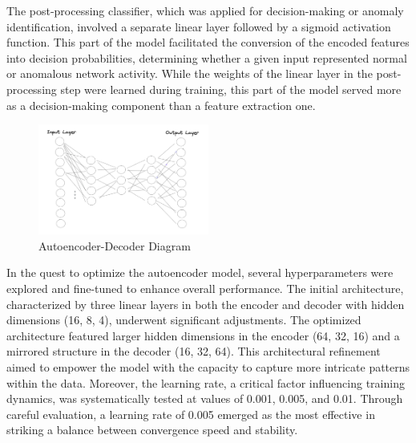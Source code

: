 \documentclass[10pt,twocolumn,letterpaper]{article}
\begin{document}
The post-processing classifier, which was applied for decision-making or anomaly identification, involved a separate linear layer followed by a sigmoid activation function. This part of the model 
facilitated the conversion of the encoded features into decision probabilities, determining whether a given input represented normal or anomalous network activity. While the weights of the linear 
layer in the post-processing step were learned during training, this part of the model served more as a decision-making component than a feature extraction one.

\begin{figure}[ht]
   \centering
   \includegraphics[width=0.5\textwidth]{images/autoenc-network.png}
   \caption{Autoencoder-Decoder Diagram}
   \label{autoenc-network}
   \end{figure}

In the quest to optimize the autoencoder model, several hyperparameters were explored and fine-tuned to enhance overall performance. The initial architecture, characterized by three linear layers in both 
the encoder and decoder with hidden dimensions (16, 8, 4), underwent significant adjustments. The optimized architecture featured larger hidden dimensions in the encoder (64, 32, 16) and a mirrored structure 
in the decoder (16, 32, 64). This architectural refinement aimed to empower the model with the capacity to capture more intricate patterns within the data. Moreover, the learning rate, a critical factor 
influencing training dynamics, was systematically tested at values of 0.001, 0.005, and 0.01. Through careful evaluation, a learning rate of 0.005 emerged as the most effective in striking a balance 
between convergence speed and stability.
\end{document}
